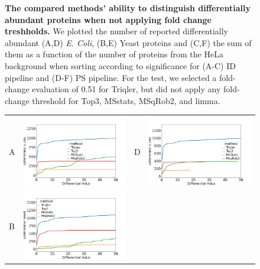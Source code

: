 \documentclass[11pt]{article}
\begin{document}
\begin{figure}[hbt]
\begin{tabular}{lclc}
    \end{tabular}
    \caption{{\bf The compared methods' ability to distinguish differentially abundant proteins when not applying fold change treshholds.} We plotted the number of reported differentially abundant  (A,D) {\em E. Coli}, (B,E) Yeast proteins and (C,F) the sum of them as a function of the number of proteins from the HeLa background when sorting according to significance for (A-C) ID pipeline and (D-F) PS pipeline. For the test, we selected a fold-change evaluation of 0.51 for Triqler, but did not apply any fold-change threshold for Top3, MSstats, MSqRob2, and limma.
    \label{fig:ability_to_differentiate_differentially_abundant_specie_vs_hela_without_threshold}}
\end{figure}




\begin{figure}[hbt]
    \centering
    \begin{tabular}{lclc} 
        A & \includegraphics[width=0.4\linewidth]{../../result/plot_full_complete_full_lib_run_20221215/diff_HeLa_vs_nonHeLa_ID_ecoli_0.png} & 
        D & \includegraphics[width=0.4\linewidth]{../../result/plot_full_complete_full_lib_run_20221215/diff_HeLa_vs_nonHeLa_ID_ecoli_0.51.png} \\ 
        B & \includegraphics[width=0.4\linewidth]{../../result/plot_full_complete_full_lib_run_20221215/diff_HeLa_vs_nonHeLa_ID_yeast_0.png} & 

\end{tabular}
\end{figure}
\end{document}
